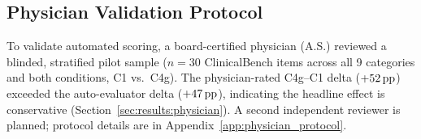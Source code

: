 \subsection{Physician Validation Protocol}
\label{sec:bench:physician}

To validate automated scoring, a board-certified physician (A.S.) reviewed a blinded, stratified pilot sample ($n=30$ ClinicalBench items across all 9 categories and both conditions, C1 vs.\ C4g).
The physician-rated C4g--C1 delta ($+52\,\text{pp}$) exceeded the auto-evaluator delta ($+47\,\text{pp}$), indicating the headline effect is conservative (Section~\ref{sec:results:physician}).
A second independent reviewer is planned; protocol details are in Appendix~\ref{app:physician_protocol}.

